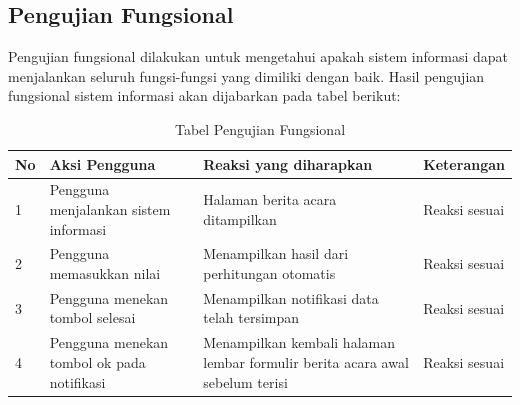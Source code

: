 		
		\subsection{Pengujian Fungsional}
		\label{sub: PFungsional}
		Pengujian fungsional dilakukan untuk mengetahui apakah sistem informasi dapat menjalankan seluruh fungsi-fungsi yang dimiliki dengan baik. Hasil pengujian fungsional sistem informasi akan dijabarkan pada tabel berikut:
		
	\begin{table}[htbp]
		\centering
		\caption{Tabel Pengujian Fungsional}
		\begin{tabular}{| m{0.75cm} | m{7cm} | m{5cm} | m{3cm} |}
			\hline
			No & Aksi Pengguna & Reaksi yang diharapkan & Keterangan \\
			\hline
			1 & Pengguna menjalankan sistem informasi & Halaman berita acara ditampilkan & Reaksi sesuai \\
			\hline
			2 & Pengguna memasukkan nilai & Menampilkan hasil dari perhitungan otomatis & Reaksi sesuai \\
			\hline
			3 & Pengguna menekan tombol selesai & Menampilkan notifikasi data telah tersimpan & Reaksi sesuai \\
			\hline
			4 & Pengguna menekan tombol ok pada notifikasi & Menampilkan kembali halaman lembar formulir berita acara awal sebelum terisi & Reaksi sesuai \\
			\hline
		\end{tabular}
	\end{table}